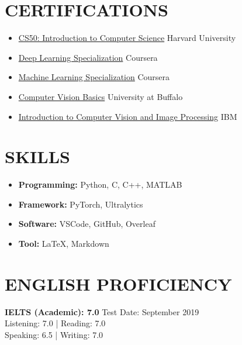 \documentclass[a4paper,9pt]{extarticle}
\begin{document}
\section*{CERTIFICATIONS}
\begin{itemize}
    \item \href{https://certificates.cs50.io/3f3f35e9-bda6-4487-84a3-2d11b3706bba.pdf?size=letter}{CS50: Introduction to Computer Science} \hfill Harvard University
    \item \href{https://www.credly.com/badges/6dfef240-b0c0-423f-9c94-897d0940c790/public_url}{Deep Learning Specialization} \hfill Coursera
    \item \href{https://www.coursera.org/account/accomplishments/specialization/N234W2TA9VF3}{Machine Learning Specialization} \hfill Coursera
    \item \href{https://www.coursera.org/account/accomplishments/certificate/L9TKVLPXS79W}{Computer Vision Basics} \hfill University at Buffalo
    \item \href{https://www.credly.com/go/GHFkiYLI}{Introduction to Computer Vision and Image Processing} \hfill IBM
\end{itemize}

\section*{SKILLS}
\begin{itemize}
    \item \textbf{Programming:} Python, C, C++, MATLAB
    \item \textbf{Framework:} PyTorch, Ultralytics
    \item \textbf{Software:} VSCode, GitHub, Overleaf
    \item \textbf{Tool:} LaTeX, Markdown
\end{itemize}

\section*{ENGLISH PROFICIENCY}
\noindent\textbf{IELTS (Academic): 7.0} \hfill Test Date: September 2019\\ 
Listening: 7.0 | Reading: 7.0 \\
Speaking: 6.5 | Writing: 7.0 
\end{document}

